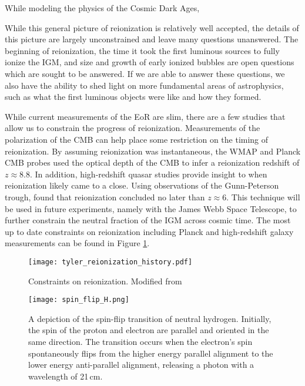 While modeling the physics of the Cosmic Dark Ages,

While this general picture of reionization is relatively well accepted, the details
of this picture are largely unconstrained and leave many questions unanswered.
The beginning of reionization, the time it took the first luminous sources to fully ionize
the IGM, and size and growth of early ionized bubbles are open questions which are
sought to be answered. If we are able to answer these questions, we also have the
ability to shed light on more fundamental areas of astrophysics, such as what the
first luminous objects were like and how they formed.

While current measurements of the EoR are slim, there are a few studies that allow us
to constrain the progress of reionization. Measurements of the polarization
of the CMB can help place some restriction on the timing of reionization. By assuming
reionization was instantaneous, the WMAP and Planck CMB probes used the optical depth of the
CMB to infer a reionization redshift of $z \approx 8.8$. In addition, high-redshift quasar studies provide insight to
when reionization likely came to a close. Using observations of the Gunn-Peterson trough, \cite{}
found that reionization concluded no later than $z \approx 6$. This technique will
be used in future experiments, namely with the James Webb Space Telescope, to further
constrain the neutral fraction of the IGM across cosmic time. The most up to date constraints on reionization including
Planck and high-redshift galaxy measurements can be found in Figure \ref{fig:reionization_constraints}.

\begin{figure}[th]
	\centering
	\texttt{[image: tyler\_reionization\_history.pdf]}
	\caption[Reionization Constraints]{Constraints on reionization. Modified from \cite{2019arXiv191103499W}}
	\label{fig:reionization_constraints}
\end{figure}


\begin{figure}[th]
	\centering
	\texttt{[image: spin\_flip\_H.png]}
	\caption[Spin-Flip Transition of Neutral Hydrogen]{A depiction of the spin-flip transition of neutral hydrogen. Initially,
																					 the spin of the proton and electron are parallel and oriented
																					 in the same direction. The transition occurs when the electron's spin spontaneously
																					 flips from the higher energy parallel alignment to the lower energy anti-parallel alignment,
																					 releasing a photon with a wavelength of 21\,cm.}
	\label{fig:spin_flip}
\end{figure}

